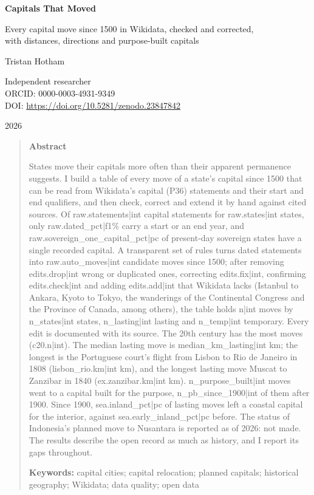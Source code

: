 \documentclass[11pt,a4paper]{article}
\begin{document}
\begin{center}
{\Large\bfseries Capitals That Moved\par}
\vspace{0.4em}
{\large Every capital move since 1500 in Wikidata, checked and corrected,\\with distances, directions and purpose-built capitals\par}
\vspace{1.2em}
{\large Tristan Hotham\par}
\vspace{0.3em}
{\small Independent researcher\\
ORCID: 0000-0003-4931-9349\\
DOI: \href{https://doi.org/10.5281/zenodo.23847842}{https://doi.org/10.5281/zenodo.23847842}\par}
\vspace{0.8em}
2026
\end{center}

\begin{quote}
\small
\begin{center}\textbf{Abstract}\end{center}
States move their capitals more often than their apparent permanence suggests. I build a table of every move of a state's capital since 1500 that can be read from Wikidata's capital (P36) statements and their start and end qualifiers, and then check, correct and extend it by hand against cited sources. Of {{raw.statements|int}} capital statements for {{raw.states|int}} states, only {{raw.dated_pct|f1}}\% carry a start or an end year, and {{raw.sovereign_one_capital_pct|pc}} of present-day sovereign states have a single recorded capital. A transparent set of rules turns dated statements into {{raw.auto_moves|int}} candidate moves since 1500; after removing {{edits.drop|int}} wrong or duplicated ones, correcting {{edits.fix|int}}, confirming {{edits.check|int}} and adding {{edits.add|int}} that Wikidata lacks (Istanbul to Ankara, Kyoto to Tokyo, the wanderings of the Continental Congress and the Province of Canada, among others), the table holds {{n|int}} moves by {{n_states|int}} states, {{n_lasting|int}} lasting and {{n_temp|int}} temporary. Every edit is documented with its source. The 20th century has the most moves ({{c20.n|int}}). The median lasting move is {{median_km_lasting|int}} km; the longest is the Portuguese court's flight from Lisbon to Rio de Janeiro in 1808 ({{lisbon_rio.km|int}} km), and the longest lasting move Muscat to Zanzibar in 1840 ({{ex.zanzibar.km|int}} km). {{n_purpose_built|int}} moves went to a capital built for the purpose, {{n_pb_since_1900|int}} of them after 1900. Since 1900, {{sea.inland_pct|pc}} of lasting moves left a coastal capital for the interior, against {{sea.early_inland_pct|pc}} before. The status of Indonesia's planned move to Nusantara is reported as of 2026: not made. The results describe the open record as much as history, and I report its gaps throughout.

\textbf{Keywords:} capital cities; capital relocation; planned capitals; historical geography; Wikidata; data quality; open data
\end{quote}
\end{document}
